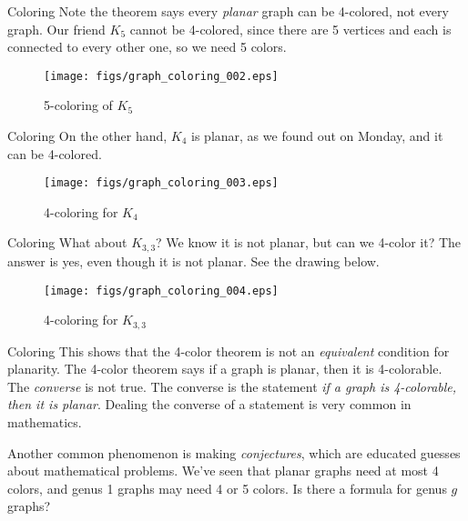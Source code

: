 \documentclass{beamer}
\begin{document}
    \begin{frame}{Coloring}
        Note the theorem says every \textit{planar} graph can be 4-colored, not every graph.
        Our friend $K_{5}$ cannot be 4-colored, since there are 5 vertices and each is connected
        to every other one, so we need 5 colors.
        \begin{figure}
            \centering
            \texttt{[image: figs/graph\_coloring\_002.eps]}
            \caption{5-coloring of $K_{5}$}
            \label{fig:coloring_002}
        \end{figure}
    \end{frame}
    \begin{frame}{Coloring}
        On the other hand, $K_{4}$ is planar, as we found out on Monday, and it can be
        4-colored.
        \begin{figure}
            \centering
            \texttt{[image: figs/graph\_coloring\_003.eps]}
            \caption{4-coloring for $K_{4}$}
            \label{fig:graph_coloring_003}
        \end{figure}
    \end{frame}
    \begin{frame}{Coloring}
        What about $K_{3,3}$? We know it is not planar, but can we 4-color it?
        The answer is yes, even though it is not planar. See the drawing below.
        \begin{figure}
            \centering
            \texttt{[image: figs/graph\_coloring\_004.eps]}
            \caption{4-coloring for $K_{3,3}$}
            \label{fig:graph_coloring_004}
        \end{figure}
    \end{frame}
    \begin{frame}{Coloring}
        This shows that the 4-color theorem is not an \textit{equivalent} condition
        for planarity. The 4-color theorem says if a graph is planar, then it
        is 4-colorable. The \textit{converse} is not true. The converse is the
        statement \textit{if a graph is 4-colorable, then it is planar}.
        Dealing the converse of a statement is very common in mathematics.
        \par\hfill\par
        Another common phenomenon is making \textit{conjectures}, which are
        educated guesses about mathematical problems. We've seen that planar
        graphs need at most 4 colors, and genus 1 graphs may need 4 or 5 colors.
        Is there a formula for genus $g$ graphs?
    \end{frame}
\end{document}
